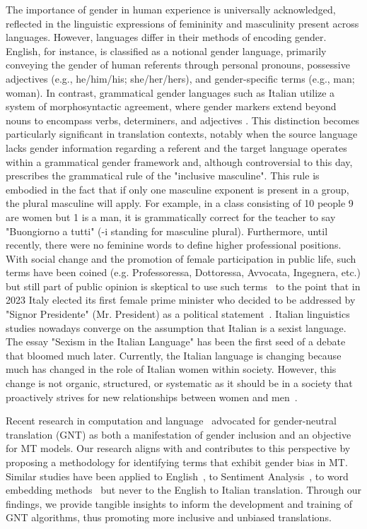 The importance of gender in human experience is universally acknowledged, reflected in the linguistic expressions of femininity and masculinity present across languages. However, languages differ in their methods of encoding gender. English, for instance, is classified as a notional gender language, primarily conveying the gender of human referents through personal pronouns, possessive adjectives (e.g., he/him/his; she/her/hers), and gender-specific terms (e.g., man; woman). In contrast, grammatical gender languages such as Italian utilize a system of morphosyntactic agreement, where gender markers extend beyond nouns to encompass verbs, determiners, and adjectives \cite{Corbett2006}. This distinction becomes particularly significant in translation contexts\cite{garzone2020chapter}, notably when the source language lacks gender information regarding a referent and the target language operates within a grammatical gender framework and, although controversial to this day, prescribes the grammatical rule of the "inclusive masculine". This rule is embodied in the fact that if only one masculine exponent is present in a group, the plural masculine will apply. For example, in a class consisting of 10 people 9 are women but 1 is a man, it is grammatically correct for the teacher to say "Buongiorno a tutti" (-i standing for masculine plural). Furthermore, until recently, there were no feminine words to define higher professional positions. With social change and the promotion of female participation in public life, such terms have been coined (e.g. Professoressa, Dottoressa, Avvocata, Ingegnera, etc.) but still part of public opinion is skeptical to use such terms~\cite{Robustelli2022} to the point that in 2023 Italy elected its first female prime minister who decided to be addressed by "Signor Presidente" (Mr. President) as a political statement~\cite{DAmico2023}. Italian linguistics studies nowadays converge on the assumption that Italian is a sexist language. The essay "Sexism in the Italian Language" \cite{Sabatini1987}  has been the first seed of a debate that bloomed much later. Currently, the Italian language is changing because much has changed in the role of Italian women within society. However, this change is not organic, structured, or systematic as it should be in a society that proactively strives for new relationships between women and men~\cite{SulisGheno2022}. 

Recent research in computation and language~\cite{Piergentili2023} advocated for gender-neutral translation (GNT) as both a manifestation of gender inclusion and an objective for MT models. Our research aligns with and contributes to this perspective by proposing a methodology for identifying terms that exhibit gender bias in MT. Similar studies have been applied to English~\cite{bolukbasi2016man}, to Sentiment Analysis~\cite{park2018reducing}, to word embedding methods~\cite{bolukbasi2016quantifying,may2019measuring} but never to the English to Italian translation. Through our findings, we provide tangible insights to inform the development and training of GNT algorithms, thus promoting more inclusive and unbiased translations.

